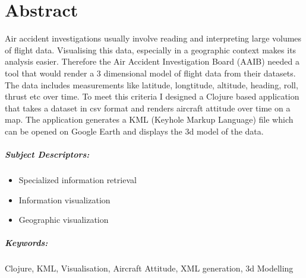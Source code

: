 

\begingroup
\let\clearpage\relax
\let\cleardoublepage\relax
\let\cleardoublepage\relax

\chapter*{Abstract} %

Air accident investigations usually involve reading and interpreting large volumes of flight data.
Visualising this data, especially in a geographic context makes its analysis easier. Therefore the Air
Accident Investigation Board (AAIB) needed a tool that would render a 3 dimensional model of flight data
from their datasets. The data includes measurements like latitude, longtitude, altitude, heading, roll, thrust etc over time.
To meet this criteria I designed a Clojure based application that takes a dataset in csv format and renders
aircraft attitude over time on a map. The application generates a KML (Keyhole Markup Language) file which
 can be opened on Google Earth and displays the 3d model of the data.\\

\paragraph{Subject Descriptors:}
\begin{itemize}
\item Specialized information retrieval
\item Information visualization
\item Geographic visualization
\end{itemize}

\paragraph{Keywords:} Clojure, KML, Visualisation, Aircraft Attitude, XML generation, 3d Modelling
\endgroup

\vfill
